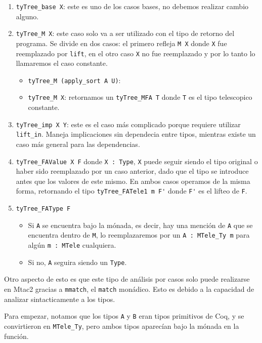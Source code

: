 \begin{enumerate}
\item \lstinline{tyTree_base X}: este es uno de los casos bases, no debemos realizar
  cambio alguno.
\item \lstinline{tyTree_M X}: este caso solo va a ser utilizado con el tipo de
  retorno del programa. Se divide en dos casos: el primero refleja \lstinline{M X}
  donde \lstinline{X} fue reemplazado por \lstinline{lift}, en el otro caso \lstinline{X} no
  fue reemplazado y por lo tanto lo llamaremos el caso constante.
  \begin{itemize}
  \item \lstinline{tyTree_M (apply_sort A U)}: 
  \item \lstinline{tyTree_M X}: retornamos un \lstinline{tyTree_MFA T} donde \lstinline{T} es
    el tipo telescopico constante.
  \end{itemize}
\item \lstinline{tyTree_imp X Y}: este es el caso más complicado porque requiere utilizar
  \lstinline{lift_in}. Maneja implicaciones sin dependecia entre tipos, mientras
  existe un caso más general para las dependencias.
\item \lstinline{tyTree_FAValue X F} donde \lstinline{X : Type}, \lstinline{X} puede seguir siendo el
  tipo original o haber sido reemplazado por un caso anterior, dado que el tipo
  se introduce antes que los valores de este mismo. En ambos casos operamos de
  la misma forma, retornando el tipo \lstinline{tyTree_FATele1 m F'} donde \lstinline{F'}
  es el lifteo de \lstinline{F}.
\item \lstinline{tyTree_FAType F}
  \begin{itemize}
  \item Si \lstinline{A} se encuentra bajo la mónada, es decir, hay una mención de
    \lstinline{A} que se encuentra dentro de \lstinline{M}, lo reemplazaremos por un
    \lstinline{A : MTele_Ty m} para algún \lstinline{m : MTele} cualquiera.
  \item Si no, \lstinline{A} seguira siendo un \lstinline{Type}.
  \end{itemize}
\end{enumerate}

Otro aspecto de esto es que este tipo de análisis por casos solo puede
realizarse en Mtac2 gracias a \lstinline{mmatch}, el \lstinline{match} monádico. Esto es
debido a la capacidad de analizar sintacticamente a los tipos.

Para empezar, notamos que los tipos \lstinline{A} y \lstinline{B} eran tipos primitivos de
Coq, y se convirtieron en \lstinline{MTele_Ty}, pero ambos tipos aparecían bajo la
mónada en la función.